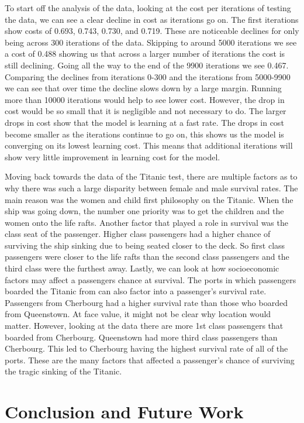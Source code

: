 \documentclass{IEEE}
\begin{document}
To start off the analysis of the data, looking at the cost per iterations of testing the data, we can see a clear decline in cost as iterations go on. The first iterations show costs of 0.693, 0.743, 0.730, and 0.719. These are noticeable declines for only being across 300 iterations of the data. Skipping to around 5000 iterations we see a cost of 0.488 showing us that across a larger number of iterations the cost is still declining. Going all the way to the end of the 9900 iterations we see 0.467. Comparing the declines from iterations 0-300 and the iterations from 5000-9900 we can see that over time the decline slows down by a large margin. Running more than 10000 iterations would help to see lower cost. However, the drop in cost would be so small that it is negligible and not necessary to do. The larger drops in cost show that the model is learning at a fast rate. The drops in cost become smaller as the iterations continue to go on, this shows us the model is converging on its lowest learning cost. This means that additional iterations will show very little improvement in learning cost for the model.

Moving back towards the data of the Titanic test, there are multiple factors as to why there was such a large disparity between female and male survival rates. The main reason was the women and child first philosophy on the Titanic. When the ship was going down, the number one priority was to get the children and the women onto the life rafts. Another factor that played a role in survival was the class seat of the passenger. Higher class passengers had a higher chance of surviving the ship sinking due to being seated closer to the deck. So first class passengers were closer to the life rafts than the second class passengers and the third class were the furthest away. Lastly, we can look at how socioeconomic factors may affect a passengers chance at survival. The ports in which passengers boarded the Titanic from can also factor into a passenger’s survival rate. Passengers from Cherbourg had a higher survival rate than those who boarded from Queenstown. At face value, it might not be clear why location would matter. However, looking at the data there are more 1st class passengers that boarded from Cherbourg. Queenstown had more third class passengers than Cherbourg. This led to Cherbourg having the highest survival rate of all of the ports. These are the many factors that affected a passenger’s chance of surviving the tragic sinking of the Titanic.

\section{Conclusion and Future Work}
\end{document}
